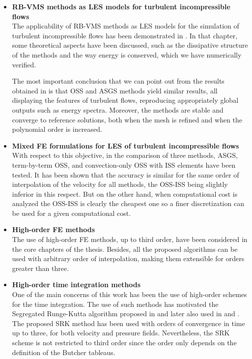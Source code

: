 \begin{itemize}
\item {\bf RB-VMS methods as LES models for turbulent incompressible flows}\\
The applicability of RB-VMS methods as LES models for the simulation of turbulent incompressible flows has been demonstrated in . In that chapter, some theoretical aspects have been discussed, such as the dissipative structure of the methods and the way energy is conserved, which we have numerically verified.

The most important conclusion that we can point out from the results obtained in  is that OSS and ASGS methods yield similar results, all displaying the features of turbulent flows, reproducing appropriately global outputs such as energy spectra. Moreover, the methods are stable and converge to reference solutions, both when the mesh is refined and when the polynomial order is increased.

\item {\bf Mixed FE formulations for LES of turbulent incompressible flows}\\
With respect to this objective, in  the comparison of three methods, ASGS, term-by-term OSS, and convection-only OSS with ISS elements have been tested. It has been shown that the accuracy is similar for the same order of interpolation of the velocity for all methods, the OSS-ISS being slightly inferior in this respect. But on the other hand, when computational cost is analyzed the OSS-ISS is clearly the cheapest one so a finer discretization can be used for a given computational cost.

\item {\bf High-order FE methods}\\
The use of high-order FE methods, up to third order, have been considered in the core chapters of the thesis. Besides, all the proposed algorithms can be used with arbitrary order of interpolation, making them extensible for orders greater than three.

\item {\bf High-order time integration methods}\\
One of the main concerns of this work has been the use of high-order schemes for the time integration. The use of such methods has motivated the Segregated Runge-Kutta algorithm proposed in  and later also used in  and . The proposed SRK method has been used with orders of convergence in time up to three, for both velocity and pressure fields. Nevertheless, the SRK scheme is not restricted to third order since the order only depends on the definition of the Butcher tableaus.


\end{itemize}

